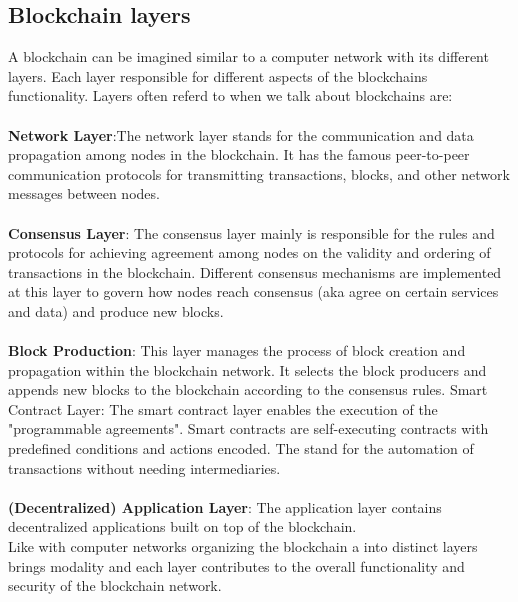 \documentclass{article}
\begin{document}
\subsection{Blockchain layers}
A blockchain can be imagined similar to a computer network with its different layers. Each layer responsible for different aspects of the blockchains functionality. Layers often referd to when we talk about blockchains are:\\
\\
\textbf{Network Layer}:The network layer stands for the communication and data propagation among nodes in the blockchain. It has the famous peer-to-peer communication protocols for transmitting transactions, blocks, and other network messages between nodes.\\
\\
\textbf{Consensus Layer}: The consensus layer mainly is responsible for the rules and protocols for achieving agreement among nodes on the validity and ordering of transactions in the blockchain. Different consensus mechanisms are implemented at this layer to govern how nodes reach consensus (aka agree on certain services and data) and produce new blocks.\\
\\
\textbf{Block Production}: This layer manages the process of block creation and propagation within the blockchain network. It selects the block producers and appends new blocks to the blockchain according to the consensus rules.
Smart Contract Layer: The smart contract layer enables the execution of the "programmable agreements". Smart contracts are self-executing contracts with predefined conditions and actions encoded. The stand for the automation of transactions without needing intermediaries.\\
\\
\textbf{(Decentralized) Application Layer}: The application layer contains decentralized applications built on top of the blockchain.
\\
Like with computer networks organizing the blockchain a into distinct layers brings modality and each layer contributes to the overall functionality and security of the blockchain network.
\end{document}
